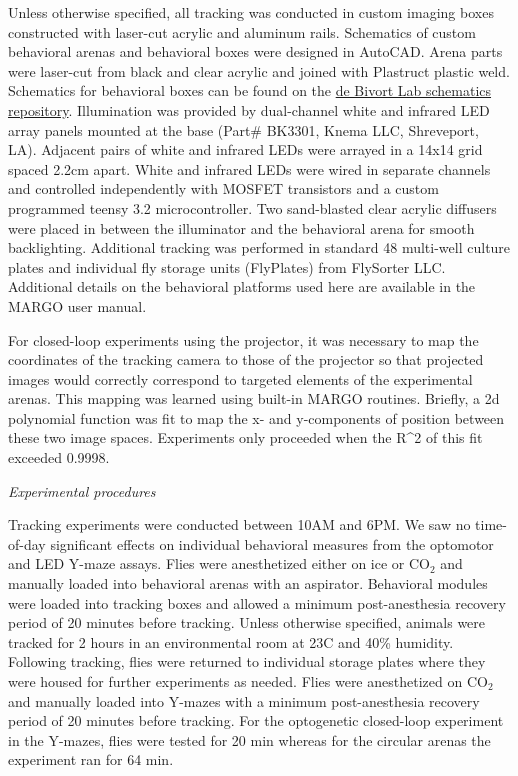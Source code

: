 \documentclass[10pt]{article}
\begin{document}
\begin{multicols}{2}
Unless otherwise specified, all tracking was conducted in custom imaging boxes constructed with laser-cut acrylic and aluminum rails. Schematics of custom behavioral arenas and behavioral boxes were designed in AutoCAD. Arena parts were laser-cut from black and clear acrylic and joined with Plastruct plastic weld. Schematics for behavioral boxes can be found on the \href{https://github.com/de-Bivort-Lab/dblab-schematics}{de Bivort Lab schematics repository}. Illumination was provided by dual-channel white and infrared LED array panels mounted at the base (Part# BK3301, Knema LLC, Shreveport, LA). Adjacent pairs of white and infrared LEDs were arrayed in a 14x14 grid spaced 2.2cm apart. White and infrared LEDs were wired in separate channels and controlled independently with MOSFET transistors and a custom programmed teensy 3.2 microcontroller. Two sand-blasted clear acrylic diffusers were placed in between the illuminator and the behavioral arena for smooth backlighting. Additional tracking was performed in standard 48 multi-well culture plates and individual fly storage units (FlyPlates) from FlySorter LLC. Additional details on the behavioral platforms used here are available in the MARGO user manual.

For closed-loop experiments using the projector, it was necessary to map the coordinates of the tracking camera to those of the projector so that projected images would correctly correspond to targeted elements of the experimental arenas. This mapping was learned using built-in MARGO routines. Briefly, a 2d polynomial function was fit to map the x- and y-components of position between these two image spaces. Experiments only proceeded when the R^{2} of this fit exceeded 0.9998. 

\vspace*{0.5cm}
\noindent\textit{Experimental procedures}
\vspace*{0.3cm}

Tracking experiments were conducted between 10AM and 6PM. We saw no time-of-day significant effects on individual behavioral measures from the optomotor and LED Y-maze assays.  Flies were anesthetized either on ice or CO$_{2}$ and manually loaded into behavioral arenas with an aspirator. Behavioral modules were loaded into tracking boxes and allowed a minimum post-anesthesia recovery period of 20 minutes before tracking. Unless otherwise specified, animals were tracked for 2 hours in an environmental room at 23\degree  C and 40\% humidity. Following tracking, flies were returned to individual storage plates where they were housed for further experiments as needed. Flies were anesthetized on CO$_{2}$ and manually loaded into Y-mazes with a minimum post-anesthesia recovery period of 20 minutes before tracking. For the optogenetic closed-loop experiment in the Y-mazes, flies were tested for 20 min whereas for the circular arenas the experiment ran for 64 min.


\end{multicols}
\end{document}
